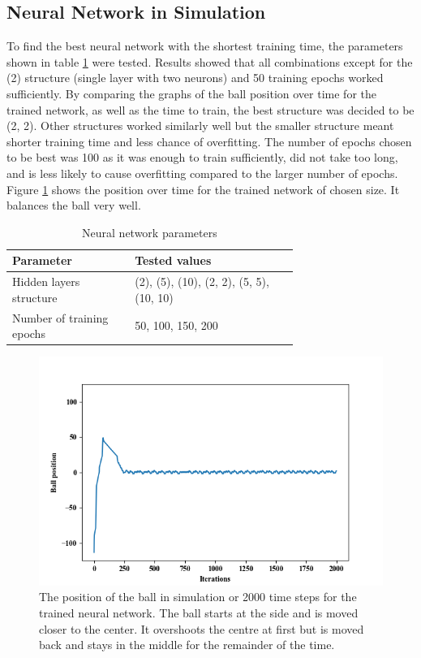 \documentclass[12pt,a4paper]{article}
\begin{document}
\subsection{Neural Network in Simulation}
To find the best neural network with the shortest training time, the parameters shown in table \ref{nn_params} were tested. Results showed that all combinations except for the (2) structure (single layer with two neurons) and 50 training epochs worked sufficiently. By comparing the graphs of the ball position over time for the trained network, as well as the time to train, the best structure was decided to be (2, 2). Other structures worked similarly well but the smaller structure meant shorter training time and less chance of overfitting. The number of epochs chosen to be best was 100 as it was enough to train sufficiently, did not take too long, and is less likely to cause overfitting compared to the larger number of epochs. Figure \ref{nn_param_test} shows the position over time for the trained network of chosen size. It balances the ball very well.
\begin{table}[htb]
\centering
\caption{Neural network parameters}
\label{nn_params}
\begin{tabular}{>{\raggedright}p{0.3\linewidth}p{0.4\linewidth}}\hline
Parameter & Tested values\\ \hline\hline
Hidden layers structure & (2), (5), (10), (2, 2), (5, 5), (10, 10)\\ \hline
Number of training epochs & 50, 100, 150, 200\\ \hline
\end{tabular}
\end{table}

\begin{figure}[H]
	\includegraphics{86_nn}
	\caption{The position of the ball in simulation or 2000 time steps for the trained neural network. The ball starts at the side and is moved closer to the center. It overshoots the centre at first but is moved back and stays in the middle for the remainder of the time.}
	\label{nn_param_test}
\end{figure}
\end{document}

